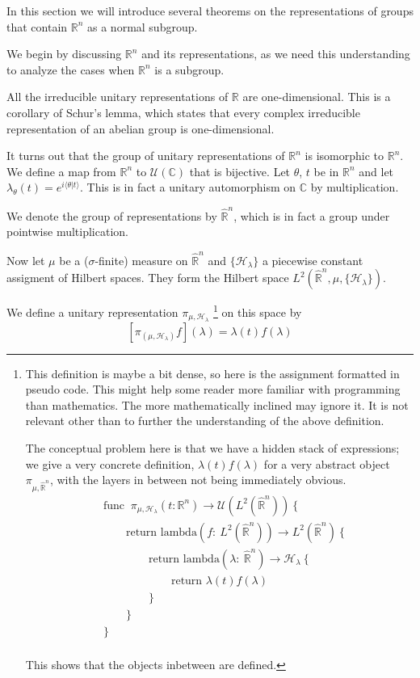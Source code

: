 \documentclass[
  12pt
]{article}
\theoremstyle{plain}
\newcommand{\bbr}{\ensuremath{\mathbb{R}}\xspace}
\newcommand{\hilb}{\ensuremath{\mathscr{H}}\xspace}
\begin{document}
  In this section we will introduce several theorems on the representations of
  groups that contain $\bbr^n$ as a normal subgroup.

  We begin by discussing $\bbr^n$ and its representations, as we need this understanding to analyze the cases when $\bbr^n$ is a subgroup.

  All the irreducible unitary representations of \bbr are one-dimensional.
  This is a corollary of Schur's lemma, which states that every complex
  irreducible representation of an abelian group is one-dimensional.

  It turns out that the group of unitary representations of $\mathbb{R}^n$ is
  isomorphic to $\mathbb{R}^n$. We define a map from $\mathbb{R}^n$ to
  $\mathcal{U}(\mathbb{C})$ that is bijective. Let $\theta$, $t$ be in
  $\mathbb{R}^n$ and let $\lambda_{\theta}(t) = e^{i\langle \theta | t
  \rangle}$. This is in fact a unitary automorphism on $\mathbb{C}$ by
  multiplication.

  We denote the group of representations by $\hat{\mathbb{R}}^n$, which
  is in fact a group under pointwise multiplication.

  Now let $\mu$ be a ($\sigma$-finite) measure on $\hat{\bbr}^n$ and
  $\{\hilb_{\lambda}\}$ a piecewise constant assigment of Hilbert spaces. They
  form the Hilbert space $L^2(\hat{\bbr}^n, \mu, \{\hilb_{\lambda}\})$.

  We define a unitary representation $\pi_{\mu, \hilb_{\lambda}}$
  \footnote{
    This definition is maybe a bit dense, so here is the assignment formatted in
    pseudo code. This might help some reader more familiar with programming than
    mathematics. The more mathematically inclined may ignore it. It is not
    relevant other than to further the understanding of the above definition.

    The conceptual problem here is that we have a hidden stack of expressions; we
    give a very concrete definition, $\lambda(t)f(\lambda)$ for a very abstract
    object $\pi_{\mu, \hat{\bbr}^n}$, with the layers in between not being
    immediately obvious.
    \begin{align*}
      & \text{func }\ \pi_{\mu,\mathscr{H}_{\lambda}}(t: \mathbb{R}^n) \rightarrow \mathcal{U}(L^2(\hat{\mathbb{R}}^n)) \ \{ \\
      & \qquad \text{return lambda}(f:\ L^2(\hat{\mathbb{R}}^n)) \rightarrow L^2(\hat{\mathbb{R}}^n) \ \{ \\
      & \qquad \qquad \text{return lambda}(\lambda:\ \hat{\mathbb{R}}^n) \rightarrow \mathscr{H}_{\lambda} \ \{ \\
      & \qquad \qquad \qquad \text{return }\lambda(t)f(\lambda) \\
      & \qquad \qquad \} \\
      & \qquad \} \\
      & \} \\
    \end{align*}

    This shows that the objects inbetween are defined.
  }
  on this space by
  $$
    [\pi_{(\mu, \hilb_{\lambda})} f](\lambda) = \lambda(t)f(\lambda)
  $$
\end{document}
